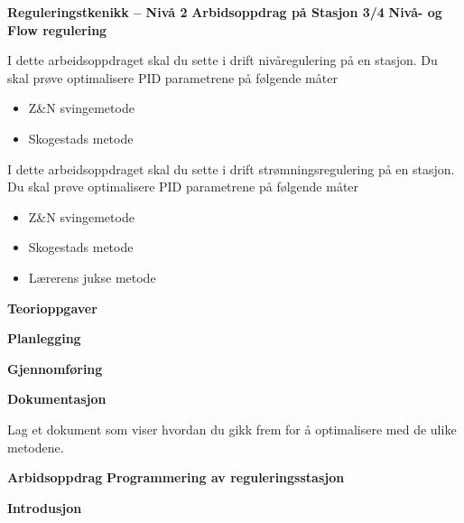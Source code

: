 

\noindent

\vskip 5pt

\begin{center}
\vskip 5pt 
\textbf{Reguleringstkenikk -- Nivå 2 }
\vskip 5pt 
\textbf{Arbidsoppdrag på Stasjon 3/4}
\vskip 5pt 
\textbf{Nivå- og Flow regulering}
\end{center}


I dette arbeidsoppdraget skal du sette i drift nivåregulering på en stasjon. Du skal prøve optimalisere PID parametrene på følgende måter\begin{itemize}[noitemsep]
\item Z\&N svingemetode
\item Skogestads metode
\end{itemize}
I dette arbeidsoppdraget skal du sette i drift strømningsregulering på en stasjon. Du skal prøve optimalisere PID parametrene på følgende måter\begin{itemize}[noitemsep]
\item Z\&N svingemetode
\item Skogestads metode
\item Lærerens jukse metode
\end{itemize}



\textbf{Teorioppgaver}

\textbf{Planlegging}

\textbf{Gjennomføring}

\textbf{Dokumentasjon}

Lag et dokument som viser hvordan du gikk frem for å optimalisere med de ulike metodene. 

\vskip 5pt
\begin{center}
\textbf{Arbidsoppdrag}
\vskip 5pt 
\textbf{Programmering av reguleringsstasjon}
\end{center}

\vskip 10pt 
\textbf{Introdusjon}

\vskip 5pt 

\vskip 5pt 


